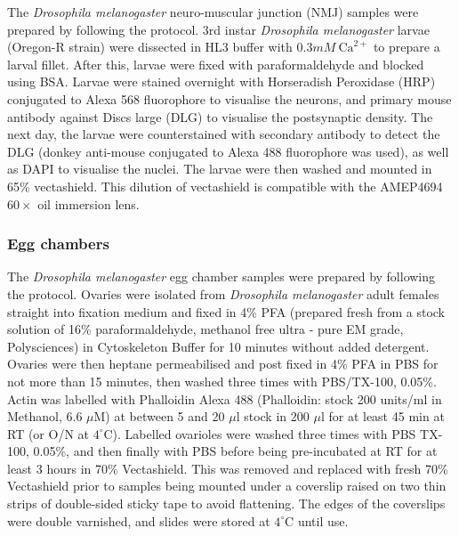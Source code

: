 The \textit{Drosophila melanogaster} neuro-muscular junction (NMJ) 
samples were prepared by following the protocol. 
3rd instar \textit{Drosophila melanogaster} larvae (Oregon-R 
strain) were dissected in HL3 buffer with $0.3mM~\text{Ca}^{2+}$ to 
prepare a larval fillet. After this, larvae were fixed with 
paraformaldehyde and blocked using BSA. Larvae were stained 
overnight with Horseradish Peroxidase (HRP) conjugated to Alexa 568 
fluorophore to visualise the neurons, and primary mouse antibody 
against Discs large (DLG) to visualise the postsynaptic density. 
The next day, the larvae were counterstained with secondary 
antibody to detect the DLG (donkey anti-mouse conjugated to 
Alexa 488 fluorophore was used), as well as DAPI to visualise the 
nuclei. The larvae were then washed and mounted in 65\% 
vectashield\cite{brent2009drosophila}. This dilution of 
vectashield is compatible with the AMEP4694 $60\times$ oil 
immersion lens.

\subsubsection{Egg chambers}
\label{subsubsec:Aurox_Egg_chambers_prep}

The \textit{Drosophila melanogaster} egg chamber samples were 
prepared by following the protocol. Ovaries were isolated from 
\textit{Drosophila melanogaster} adult females straight into fixation 
medium and fixed in 4\% PFA (prepared fresh from a stock solution 
of 16\% paraformaldehyde, methanol free ultra - pure EM grade, 
Polysciences) in Cytoskeleton Buffer for 10 minutes without added 
detergent\cite{jia2016automatic,zhang2020nanoscale,leyton2016pfa}. 
Ovaries were then heptane permeabilised and post fixed in 4\% PFA 
in PBS for not more than 15 minutes, then washed three times with 
PBS/TX-100, 0.05\%. Actin was labelled with Phalloidin Alexa 488 
(Phalloidin: stock 200 units/ml in Methanol, 6.6 $\mu$M) at between 
5 and 20 $\mu$l stock in 200 $\mu$l for at least 45 min at RT (or 
O/N at $4^{\circ}$C). Labelled ovarioles were washed three times with 
PBS TX-100, 0.05\%, and then finally with PBS before being 
pre-incubated at RT for at least 3 hours in 70\% Vectashield. This 
was removed and replaced with fresh 70\% Vectashield prior to samples 
being mounted under a coverslip raised on two thin strips of 
double-sided sticky tape to avoid flattening\cite{davidson2016localized}.
The edges of the coverslips were double varnished, and slides were stored 
at $4^{\circ}$C until use.

